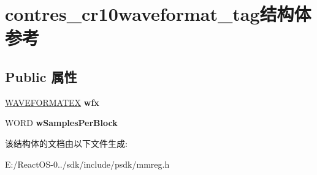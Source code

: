 \hypertarget{structcontres__cr10waveformat__tag}{}\section{contres\+\_\+cr10waveformat\+\_\+tag结构体 参考}
\label{structcontres__cr10waveformat__tag}
\subsection*{Public 属性}
\begin{DoxyCompactItemize}
\item 
\mbox{\label{structcontres__cr10waveformat__tag_a20f0f3fe04cd43b69c55b5cbdc93bd34}} 
\hyperlink{struct_w_a_v_e_f_o_r_m_a_t_e_x}{W\+A\+V\+E\+F\+O\+R\+M\+A\+T\+EX} {\bfseries wfx}
\item 
\mbox{\label{structcontres__cr10waveformat__tag_a5a0bb342b894310bf3c257f324ba5742}} 
W\+O\+RD {\bfseries w\+Samples\+Per\+Block}
\end{DoxyCompactItemize}


该结构体的文档由以下文件生成\+:\begin{DoxyCompactItemize}
\item 
E\+:/\+React\+O\+S-\/0../sdk/include/psdk/mmreg.\+h\end{DoxyCompactItemize}
